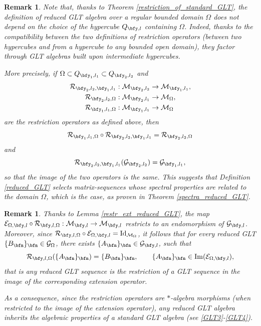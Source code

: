 \documentclass{amsart}
\newtheorem{rem}[thm]{Remark}
\begin{document}
\begin{rem}\label{well-posedness}
    Note that, thanks to Theorem \ref{restriction_of_standard_GLT}, the definition of reduced GLT algebra over a regular bounded domain $\Omega$ does not depend on the choice of the hypercube $Q_{\bfy,l}$ containing $\Omega$. Indeed, thanks to the compatibility between the two definitions of restriction operators (between two hypercubes and from a hypercube to any bounded open domain), they factor through GLT algebras built upon intermediate hypercubes. 
    
    More precisely, if $\Omega\subset Q_{\bfy_1,l_1}\subset Q_{\bfy_2,l_2}$ and 
    \begin{align*}
        \mathcal{R}_{\bfy_2,l_2,\bfy_1,l_1}&:\mathcal{M}_{\bfy_2,l_2}\to\mathcal{M}_{\bfy_1,l_1},\\
        \mathcal{R}_{\bfy_2,l_2,\Omega}&:\mathcal{M}_{\bfy_2,l_1}\to\mathcal{M}_{\Omega},\\
        \mathcal{R}_{\bfy_1,l_1,\Omega}&:\mathcal{M}_{\bfy_1,l_1}\to\mathcal{M}_{\Omega}
    \end{align*}
    are the restriction operators as defined above, then 
    \begin{equation*}
         \mathcal{R}_{\bfy_1,l_1,\Omega}\circ\mathcal{R}_{\bfy_2,l_2,\bfy_1,l_1}=\mathcal{R}_{\bfy_2,l_2,\Omega}
    \end{equation*}
    and 
    \begin{equation*}
        \mathcal{R}_{\bfy_2,l_2,\bfy_1,l_1}(\mathcal{G}_{\bfy_2,l_2})=\mathcal{G}_{\bfy_1,l_1},
    \end{equation*}
    so that the image of the two operators is the same. This suggests that Definition \ref{reduced_GLT} selects matrix-sequences whose spectral properties are related to the domain $\Omega$, which is the case, as proven in Theorem \ref{spectra_reduced_GLT}. 
\end{rem}
\begin{rem}\label{algebra_morphisms_red}
    Thanks to Lemma \ref{restr_ext_reduced_GLT}, the map $\mathcal{E}_{\Omega,\bfy,l}\circ\mathcal{R}_{\bfy,l,\Omega}:\mathcal{M}_{\bfy,l}\to\mathcal{M}_{\bfy,l}$ restricts to an endomorphism of $\mathcal{G}_{\bfy,l}$. Moreover, since $\mathcal{R}_{\bfy,l,\Omega}\circ\mathcal{E}_{\Omega,\bfy,l}=\mathrm{Id}_{\mathcal{M}_{\Omega}}$, it follows that for every reduced GLT $\{B_\bfn\}_\bfn\in\mathcal{G}_{\Omega}$, there exists $\{A_\bfn\}_\bfn\in\mathcal{G}_{\bfy,l}$, such that
    \begin{equation*}
        \mathcal{R}_{\bfy,l,\Omega}(\{A_\bfn\}_\bfn)=\{B_\bfn\}_\bfn,\qquad \{A_\bfn\}_\bfn\in\mathrm{Im}(\mathcal{E}_{\Omega,\bfy,l}),
    \end{equation*}
    that is any reduced GLT sequence is the restriction of a GLT sequence in the image of the corresponding extension operator. 
    
    As a consequence, since the restriction operators are $*$-algebra morphisms (when restricted to the image of the extension operator), any reduced GLT algebra inherits the algebraic properties of a standard GLT algebra (see \ref{GLT3}-\ref{GLT4}).
\end{rem}
\end{document}
